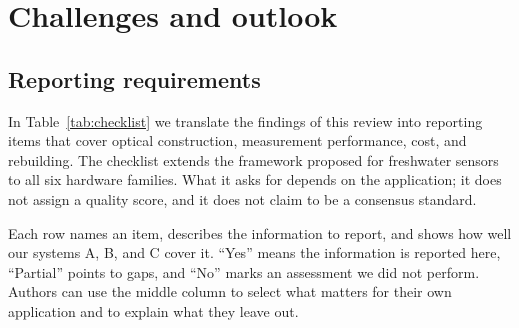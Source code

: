 \section{Challenges and outlook}\label{sec:outlook}

\subsection{Reporting requirements}

In Table~\ref{tab:checklist} we translate the findings of this review into reporting items that cover optical construction, measurement performance, cost, and rebuilding. The checklist extends the framework proposed for freshwater sensors\citep{cirrone2026analytical} to all six hardware families. What it asks for depends on the application; it does not assign a quality score, and it does not claim to be a consensus standard.

Each row names an item, describes the information to report, and shows how well our systems A, B, and C cover it. ``Yes'' means the information is reported here, ``Partial'' points to gaps, and ``No'' marks an assessment we did not perform. Authors can use the middle column to select what matters for their own application and to explain what they leave out.

